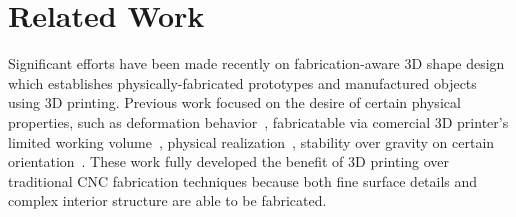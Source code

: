 \section{Related Work}
\label{sec:related}




Significant efforts have been made recently on fabrication-aware 3D shape design which establishes physically-fabricated prototypes and manufactured objects using 3D printing. Previous work focused on the desire of certain physical properties, such as deformation behavior~\cite{Bickel:2010}, fabricatable via comercial 3D printer's limited working volume~\cite{luo2012chopper}, physical realization~\cite{stava:2012}, stability over gravity on certain orientation~\cite{prevost:2013, bacher2014spin}. These work fully developed the benefit of 3D printing over traditional CNC fabrication techniques because both fine surface details and complex interior structure are able to be fabricated.


